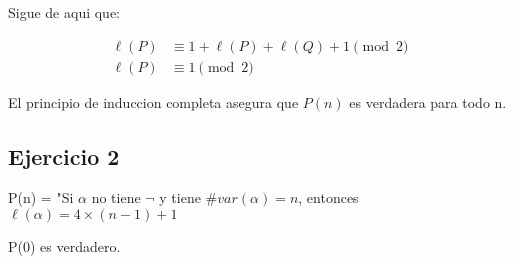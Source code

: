 Sigue de aqui que:

\begin{align} 
	\ell(P) &\equiv 1 + \ell(P) + \ell(Q) + 1 \pmod 2\\
	\ell(P) &\equiv 1 \pmod 2
\end{align}

El principio de induccion completa asegura que $P(n)$ es verdadera para todo n.

\subsection*{Ejercicio 2} 

P(n) = "Si $\alpha$ no tiene $\neg$ y tiene $\#var(\alpha) = n$, entonces $\ell(\alpha) = 4\times(n - 1) + 1$

P(0) es verdadero.

